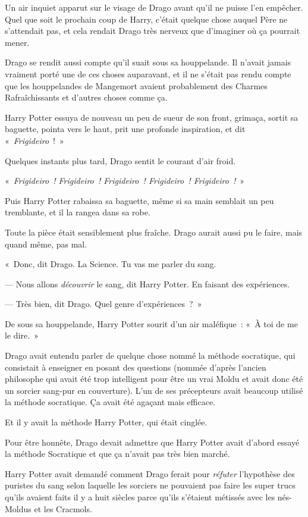 Un air inquiet apparut sur le visage de Drago avant qu'il ne puisse l'en empêcher. Quel que soit le prochain coup de Harry, c'était quelque chose auquel Père ne s'attendait pas, et cela rendait Drago très nerveux que d'imaginer où ça pourrait mener.

Drago se rendit aussi compte qu'il suait sous sa houppelande. Il n'avait jamais vraiment porté une de ces choses auparavant, et il ne s'était pas rendu compte que les houppelandes de Mangemort avaient probablement des Charmes Rafraîchissants et d'autres choses comme ça.

Harry Potter essuya de nouveau un peu de sueur de son front, grimaça, sortit sa baguette, pointa vers le haut, prit une profonde inspiration, et dit «~\emph{Frigideiro}~!~»

Quelques instants plus tard, Drago sentit le courant d'air froid.

«~\emph{Frigideiro~! Frigideiro~! Frigideiro~! Frigideiro~! Frigideiro~!}~»

Puis Harry Potter rabaissa sa baguette, même si sa main semblait un peu tremblante, et il la rangea dans sa robe.

Toute la pièce était sensiblement plus fraîche. Drago aurait aussi pu le faire, mais quand même, pas mal.

«~Donc, dit Drago. La Science. Tu vas me parler du sang.

--- Nous allons \emph{découvrir} le sang, dit Harry Potter. En faisant des expériences.

--- Très bien, dit Drago. Quel genre d'expériences~?~»

De sous sa houppelande, Harry Potter sourit d'un air maléfique~: «~À toi de me le dire.~»

\later

Drago avait entendu parler de quelque chose nommé la méthode socratique, qui consistait à enseigner en posant des questions (nommée d'après l'ancien philosophe qui avait été trop intelligent pour être un vrai Moldu et avait donc été un sorcier sang-pur en couverture). L'un de ses précepteurs avait beaucoup utilisé la méthode socratique. Ça avait été agaçant mais efficace.

Et il y avait la méthode Harry Potter, qui était cinglée.

Pour être honnête, Drago devait admettre que Harry Potter avait d'abord essayé la méthode Socratique et que ça n'avait pas très bien marché.

Harry Potter avait demandé comment Drago ferait pour \emph{réfuter} l'hypothèse des puristes du sang selon laquelle les sorciers ne pouvaient pas faire les super trucs qu'ils avaient faits il y a huit siècles parce qu'ils s'étaient métissés avec les nés-Moldus et les Cracmols.

